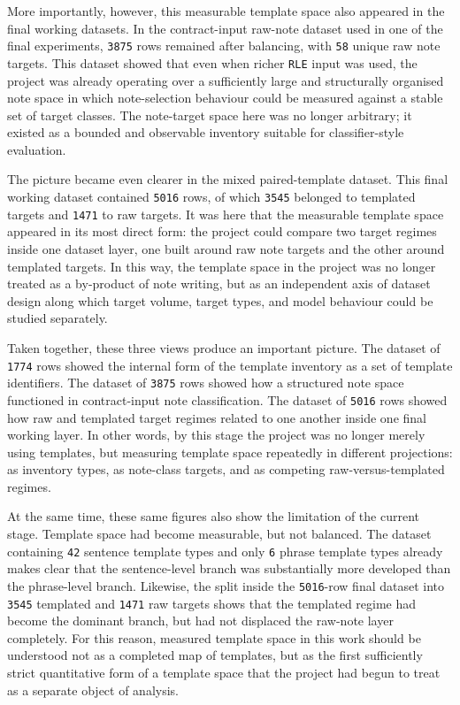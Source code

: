 \documentclass[12pt,a4paper,oneside]{report}
\begin{document}
More importantly, however, this measurable template space also appeared in the final working datasets. In the contract-input raw-note dataset used in one of the final experiments, \texttt{3875} rows remained after balancing, with \texttt{58} unique raw note targets. This dataset showed that even when richer \texttt{RLE} input was used, the project was already operating over a sufficiently large and structurally organised note space in which note-selection behaviour could be measured against a stable set of target classes. The note-target space here was no longer arbitrary; it existed as a bounded and observable inventory suitable for classifier-style evaluation.

The picture became even clearer in the mixed paired-template dataset. This final working dataset contained \texttt{5016} rows, of which \texttt{3545} belonged to templated targets and \texttt{1471} to raw targets. It was here that the measurable template space appeared in its most direct form: the project could compare two target regimes inside one dataset layer, one built around raw note targets and the other around templated targets. In this way, the template space in the project was no longer treated as a by-product of note writing, but as an independent axis of dataset design along which target volume, target types, and model behaviour could be studied separately.

Taken together, these three views produce an important picture. The dataset of \texttt{1774} rows showed the internal form of the template inventory as a set of template identifiers. The dataset of \texttt{3875} rows showed how a structured note space functioned in contract-input note classification. The dataset of \texttt{5016} rows showed how raw and templated target regimes related to one another inside one final working layer. In other words, by this stage the project was no longer merely using templates, but measuring template space repeatedly in different projections: as inventory types, as note-class targets, and as competing raw-versus-templated regimes.

At the same time, these same figures also show the limitation of the current stage. Template space had become measurable, but not balanced. The dataset containing \texttt{42} sentence template types and only \texttt{6} phrase template types already makes clear that the sentence-level branch was substantially more developed than the phrase-level branch. Likewise, the split inside the \texttt{5016}-row final dataset into \texttt{3545} templated and \texttt{1471} raw targets shows that the templated regime had become the dominant branch, but had not displaced the raw-note layer completely. For this reason, measured template space in this work should be understood not as a completed map of templates, but as the first sufficiently strict quantitative form of a template space that the project had begun to treat as a separate object of analysis.
\end{document}
